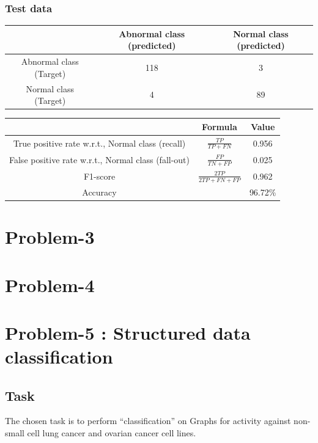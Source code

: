 \documentclass[fleqn]{article}
\begin{document}
\subsubsection{Test data}

\begin{center}
  \begin{longtable}{ c | c | c  }
	\multicolumn{1}{c}{ } & 
	\multicolumn{1}{c}{Abnormal class (predicted)} & 
	\multicolumn{1}{c}{Normal class (predicted)} \\
    \hline
    Abnormal class (Target)& 118 & 3 \\ \hline
    Normal class (Target)& 4 & 89 \\ \hline
  \end{longtable}
\end{center}    

\begin{center}
  \begin{longtable}{ c | c | c  }
  	\multicolumn{1}{c}{ } & 
	\multicolumn{1}{c}{Formula} & 
	\multicolumn{1}{c}{Value} \\\hline
	True positive rate w.r.t., Normal class (recall)  & $\frac{TP}{TP + FN}$ & 0.956 \\\hline
	False positive rate w.r.t., Normal class (fall-out)  & $\frac{FP}{TN + FP}$ & 0.025\\\hline
	F1-score & $\frac{2TP}{2TP + FN + FP}$ & 0.962\\\hline
	Accuracy & & 96.72\%\\\hline
  \end{longtable}
\end{center} 

\newpage
\section{Problem-3}
\section{Problem-4}
\newpage
\section{Problem-5 : Structured data classification}
\subsection{Task}
The chosen task is to perform ``classification'' on Graphs for 
activity against non-small cell lung cancer and ovarian cancer cell lines.
\end{document}
